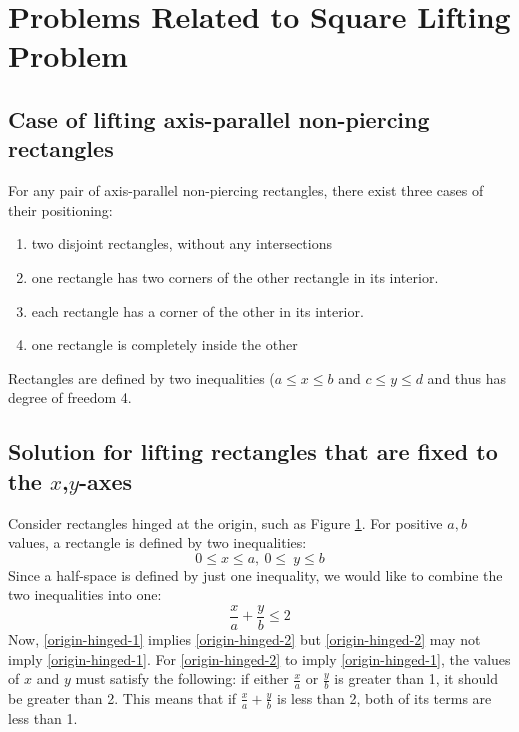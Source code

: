 \documentclass{NSF}
\begin{document}
\section{Problems Related to Square Lifting Problem}

\subsection{Case of lifting axis-parallel non-piercing rectangles}
For any pair of axis-parallel non-piercing rectangles, there exist three cases of their positioning:
\begin{enumerate}
\item two disjoint rectangles, without any intersections
\item one rectangle has two corners of the other rectangle in its interior.
\item each rectangle has a corner of the other in its interior.
\item one rectangle is completely inside the other
\end{enumerate}
Rectangles are defined by two inequalities ($a\leq x \leq b$ and $c \leq y \leq d$ and thus has degree of freedom 4.

\begin{figure}[ht]
\hspace{.3in}
\caption{}
\label{fig:origin-building-example}
\end{figure}

\subsection{Solution for lifting rectangles that are fixed to the \texorpdfstring{$x$,$y$}{x,y}-axes}

Consider rectangles hinged at the origin, such as Figure \ref{fig:origin-building-example}. For positive $a,b$ values, a rectangle is defined by two inequalities: 
\begin{equation}\label{origin-hinged-1}
0 \leq x \leq a,\  0\leq \  y \leq b
\end{equation}
Since a half-space is defined by just one inequality, we would like to combine the two inequalities into one: 
\begin{equation}\label{origin-hinged-2}
\frac{x}{a} + \frac{y}{b} \leq 2
\end{equation}
Now, \eqref{origin-hinged-1} implies \eqref{origin-hinged-2} but \eqref{origin-hinged-2}  may not imply \eqref{origin-hinged-1}. For \eqref{origin-hinged-2} to imply \eqref{origin-hinged-1}, the values of $x$ and $y$ must satisfy the following: if either $\frac{x}{a}$ or $\frac{y}{b}$ is greater than 1, it should be greater than 2. This means that if $\frac{x}{a}+\frac{y}{b}$  is less than 2, both of its terms are less than 1.
\end{document}
